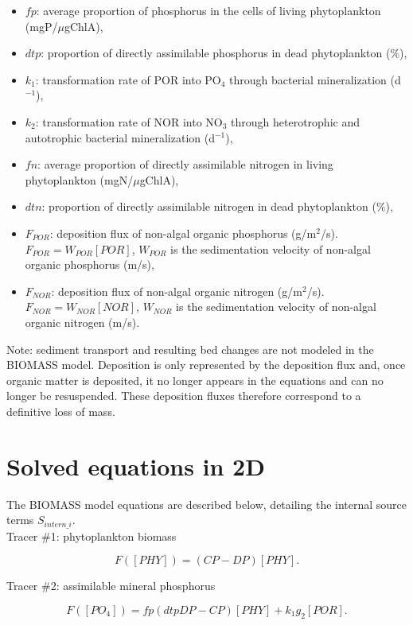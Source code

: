 \begin{itemize}
\item $fp$: average proportion of phosphorus in the cells of living phytoplankton (mgP/$\mu$gChlA),
\item $dtp$: proportion of directly assimilable phosphorus in dead phytoplankton ($\%$),
\item $k_1$: transformation rate of POR into PO$_4$ through bacterial mineralization (d$^{-1}$),
\item $k_2$: transformation rate of NOR into NO$_3$ through heterotrophic
  and autotrophic bacterial mineralization (d$^{-1}$),
\item $fn$: average proportion of directly assimilable nitrogen in living phytoplankton (mgN/$\mu$gChlA),
\item $dtn$: proportion of directly assimilable nitrogen in dead phytoplankton ($\%$),
\item $F_{POR}$: deposition flux of non-algal organic phosphorus (g/m$^2$/s).
  $F_{POR} = W_{POR} [POR]$, $W_{POR}$ is the sedimentation velocity of non-algal organic phosphorus (m/s),
\item $F_{NOR}$: deposition flux of non-algal organic nitrogen (g/m$^2$/s).
  $F_{NOR} = W_{NOR} [NOR]$, $W_{NOR}$ is the sedimentation velocity of non-algal organic nitrogen (m/s).
\end{itemize}

Note: sediment transport and resulting bed changes are not modeled in the BIOMASS model.
Deposition is only represented by the deposition flux and,
once organic matter is deposited,
it no longer appears in the equations and can no longer be resuspended.
These deposition fluxes therefore correspond to a definitive loss of mass.

\section{Solved equations in 2D}

The BIOMASS model equations are described below, detailing the internal source terms $S_{intern\_i}$.\\

Tracer $\#$1: phytoplankton biomass

\begin{equation}
  F([PHY]) = (CP-DP) [PHY].
\end{equation}

Tracer $\#$2: assimilable mineral phosphorus

\begin{equation}
  F([PO_4]) = fp(dtp DP - CP) [PHY] + k_1 g_2 [POR].
\end{equation}

